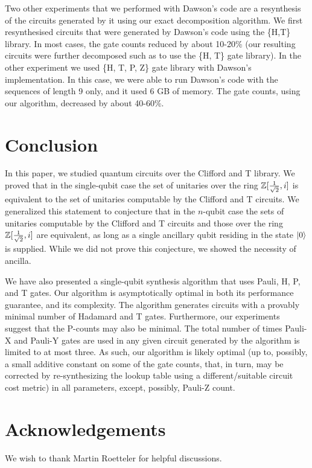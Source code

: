 \documentclass[english,journal]{extarticle}
\theoremstyle{plain}
\theoremstyle{plain}
\theoremstyle{plain}
\theoremstyle{definition}
\theoremstyle{plain}
\theoremstyle{plain}
\begin{document}
Two other experiments that we performed with Dawson's code are a resynthesis of the
circuits generated by it using our exact decomposition algorithm.  We first
resynthesised circuits that were generated by Dawson's code using the \{H,T\}
library.  In most cases, the gate counts reduced by about 10-20\% (our resulting
circuits were further decomposed such as to use the \{H, T\} gate library).  In the other experiment we used
\{H, T, P, Z\} gate library with Dawson's implementation.  In this case, we were able
to run Dawson's code with the sequences of length 9 only, and it used 6 GB of memory.  The
gate counts, using our algorithm, decreased by about 40-60\%.  

\section{Conclusion}
\noindent
In this paper, we studied quantum circuits over the Clifford and T library. We proved that in the single-qubit case the set of unitaries over the ring $\mathbb{Z}[\frac{1}{\sqrt{2}},i]$ is equivalent to the set of 
unitaries computable by the Clifford and T circuits.  We generalized this statement to conjecture that in the $n$-qubit 
case the sets of unitaries computable by the Clifford and T circuits and those over the ring $\mathbb{Z}[\frac{1}{\sqrt{2}},i]$ are equivalent, as long 
as a single ancillary qubit residing in the state $\left|0\right\rangle$ is supplied.  While we did not prove this conjecture, we showed 
the necessity of ancilla. 

We have also presented a single-qubit synthesis algorithm that uses Pauli, H, P, and T gates.  Our algorithm is asymptotically optimal 
in both its performance guarantee, and its complexity.  The algorithm generates circuits with a provably minimal number of Hadamard and T gates. 
Furthermore, our experiments suggest that the P-counts may also be minimal.  The total number of times Pauli-X and Pauli-Y gates 
are used in any given circuit generated by the algorithm is limited to at most three.  As such, our algorithm is likely optimal (up to, possibly, a small additive constant on some of the gate counts, that, in turn, 
may be corrected by re-synthesizing the lookup table using a different/suitable circuit cost metric) in all parameters, except, possibly, Pauli-Z count.

\section*{Acknowledgements}
\noindent
We wish to thank Martin Roetteler for helpful discussions. 
\end{document}
